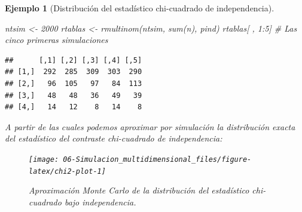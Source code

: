 \documentclass[
]{book}
\newenvironment{Shaded}{\begin{snugshade}}{\end{snugshade}}
\newcommand{\AttributeTok}[1]{\textcolor[rgb]{0.77,0.63,0.00}{#1}}
\newcommand{\CommentTok}[1]{\textcolor[rgb]{0.56,0.35,0.01}{\textit{#1}}}
\newcommand{\ConstantTok}[1]{\textcolor[rgb]{0.00,0.00,0.00}{#1}}
\newcommand{\ControlFlowTok}[1]{\textcolor[rgb]{0.13,0.29,0.53}{\textbf{#1}}}
\newcommand{\DecValTok}[1]{\textcolor[rgb]{0.00,0.00,0.81}{#1}}
\newcommand{\FunctionTok}[1]{\textcolor[rgb]{0.00,0.00,0.00}{#1}}
\newcommand{\NormalTok}[1]{#1}
\newcommand{\OtherTok}[1]{\textcolor[rgb]{0.56,0.35,0.01}{#1}}
\newcommand{\SpecialCharTok}[1]{\textcolor[rgb]{0.00,0.00,0.00}{#1}}
\newcommand{\StringTok}[1]{\textcolor[rgb]{0.31,0.60,0.02}{#1}}
\theoremstyle{break}
\newtheorem{example}{Ejemplo}[chapter]
\theoremstyle{nonumberplain}
\begin{document}
\begin{example}[Distribución del estadístico chi-cuadrado de independencia]
\begin{Shaded}
\begin{Highlighting}[]
\NormalTok{ntsim }\OtherTok{\textless{}{-}} \DecValTok{2000}
\NormalTok{rtablas }\OtherTok{\textless{}{-}} \FunctionTok{rmultinom}\NormalTok{(ntsim, }\FunctionTok{sum}\NormalTok{(n), pind)}
\NormalTok{rtablas[ , }\DecValTok{1}\SpecialCharTok{:}\DecValTok{5}\NormalTok{] }\CommentTok{\# Las cinco primeras simulaciones}
\end{Highlighting}
\end{Shaded}

\begin{verbatim}
##      [,1] [,2] [,3] [,4] [,5]
## [1,]  292  285  309  303  290
## [2,]   96  105   97   84  113
## [3,]   48   48   36   49   39
## [4,]   14   12    8   14    8
\end{verbatim}

A partir de las cuales podemos aproximar por simulación la distribución exacta del estadístico del contraste chi-cuadrado de independencia:

\begin{Shaded}
\end{Shaded}

\begin{figure}[!htb]

{\centering \texttt{[image: 06-Simulacion\_multidimensional\_files/figure-latex/chi2-plot-1]} 

}

\caption{Aproximación Monte Carlo de la distribución del estadístico chi-cuadrado bajo independencia.}\label{fig:chi2-plot}
\end{figure}


\end{example}
\end{document}
